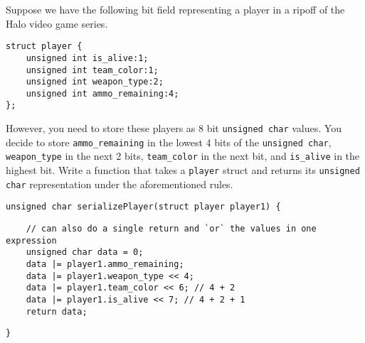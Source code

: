Suppose we have the following bit field representing a player in a ripoff of the Halo video game series.

\begin{verbatim}
struct player {
    unsigned int is_alive:1;
    unsigned int team_color:1;
    unsigned int weapon_type:2;
    unsigned int ammo_remaining:4;
};
\end{verbatim}

However, you need to store these players as 8 bit \texttt{unsigned char} values.
You decide to store \texttt{ammo\_remaining} in the lowest 4 bits of the \texttt{unsigned char},
\texttt{weapon\_type} in the next 2 bits,
\texttt{team\_color} in the next bit,
and \texttt{is\_alive} in the highest bit.
Write a function that takes a \texttt{player} struct and
returns its \texttt{unsigned char} representation under the aforementioned rules.

\begin{verbatim}
unsigned char serializePlayer(struct player player1) {
\end{verbatim}
\begin{answer}
\begin{verbatim}
    // can also do a single return and `or` the values in one expression
    unsigned char data = 0;
    data |= player1.ammo_remaining;
    data |= player1.weapon_type << 4;
    data |= player1.team_color << 6; // 4 + 2
    data |= player1.is_alive << 7; // 4 + 2 + 1
    return data;
\end{verbatim}
\end{answer}
\begin{verbatim}
}
\end{verbatim}
